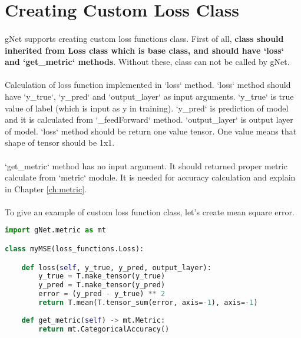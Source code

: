 \documentclass[12pt]{report}
\begin{document}
\section{Creating Custom Loss Class}

\paragraph{}
gNet supports creating custom loss functions class. First of all, \textbf{class should inherited from Loss class which is base class, and should have `loss` and `get\_metric` methods}. Without these, class can not be called by gNet. 

\paragraph{}
Calculation of loss function implemented in `loss` method. `loss` method should have `y\_true`, `y\_pred` and `output\_layer` as input arguments. `y\_true` is true value of label (which is input as y in training). `y\_pred` is prediction of model and it is calculated from `\_feedForward` method. `output\_layer` is output layer of model. `loss` method should be return one value tensor. One value means that shape of tensor should be 1x1.  

\paragraph{}
`get\_metric` method has no input argument. It should returned proper metric calculate from `metric` module. It is needed for accuracy calculation and explain in Chapter \ref{ch:metric}.

\paragraph{}
To give an example of custom loss function class, let's create mean square error. 


\begin{lstlisting}[language=Python, numbers=none, caption={Custom loss function class.}, label={lis:loss-custom-class}]
import gNet.metric as mt

class myMSE(loss_functions.Loss):

	def loss(self, y_true, y_pred, output_layer):  
		y_true = T.make_tensor(y_true)
		y_pred = T.make_tensor(y_pred)
		error = (y_pred - y_true) ** 2
		return T.mean(T.tensor_sum(error, axis=-1), axis=-1)
	
	def get_metric(self) -> mt.Metric:
		return mt.CategoricalAccuracy()

\end{lstlisting}
\end{document}
